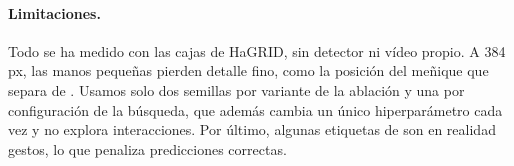 \paragraph{Limitaciones.}
Todo se ha medido con las cajas de HaGRID, sin detector ni vídeo propio. A 384\,px, las manos
pequeñas pierden detalle fino, como la posición del meñique que separa  de .
Usamos solo dos semillas por variante de la ablación y una por configuración de la búsqueda, que
además cambia un único hiperparámetro cada vez y no explora interacciones. Por último, algunas
etiquetas de  son en realidad gestos, lo que penaliza predicciones correctas.

